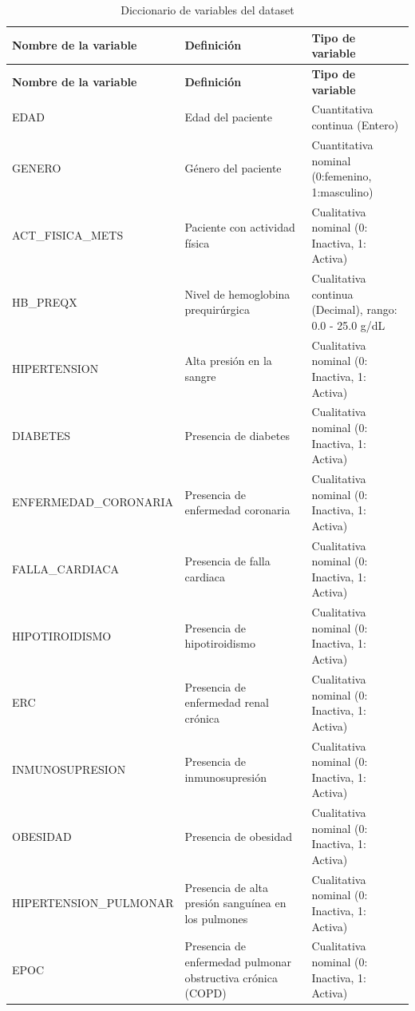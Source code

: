 \begin{center}
\scriptsize 
\renewcommand{\arraystretch}{1.4} 
\begin{xltabular}{\textwidth}{|>{\raggedright\arraybackslash}p{5cm}|>{\raggedright\arraybackslash}X|>{\raggedright\arraybackslash}p{4cm}|}
\caption{Diccionario de variables del dataset} \label{tab:diccionario} \\
\hline
\textbf{Nombre de la variable} & \textbf{Definición} & \textbf{Tipo de variable} \\ \hline
\endfirsthead
\hline
\textbf{Nombre de la variable} & \textbf{Definición} & \textbf{Tipo de variable} \\ \hline
\endhead
\hline
\endfoot
\hline
\endlastfoot
EDAD & Edad del paciente & Cuantitativa continua (Entero) \\ \hline
GENERO & Género del paciente & Cuantitativa nominal (0:femenino, 1:masculino) \\ \hline
ACT\_FISICA\_METS & Paciente con actividad física & Cualitativa nominal (0: Inactiva, 1: Activa) \\ \hline
HB\_PREQX & Nivel de hemoglobina prequirúrgica & Cualitativa continua (Decimal), rango: 0.0 - 25.0 g/dL \\ \hline
HIPERTENSION & Alta presión en la sangre & Cualitativa nominal (0: Inactiva, 1: Activa) \\ \hline
DIABETES & Presencia de diabetes & Cualitativa nominal (0: Inactiva, 1: Activa) \\ \hline
ENFERMEDAD\_CORONARIA & Presencia de enfermedad coronaria & Cualitativa nominal (0: Inactiva, 1: Activa) \\ \hline
FALLA\_CARDIACA & Presencia de falla cardiaca & Cualitativa nominal (0: Inactiva, 1: Activa) \\ \hline
HIPOTIROIDISMO & Presencia de hipotiroidismo & Cualitativa nominal (0: Inactiva, 1: Activa) \\ \hline
ERC & Presencia de enfermedad renal crónica & Cualitativa nominal (0: Inactiva, 1: Activa) \\ \hline
INMUNOSUPRESION & Presencia de inmunosupresión & Cualitativa nominal (0: Inactiva, 1: Activa) \\ \hline
OBESIDAD & Presencia de obesidad & Cualitativa nominal (0: Inactiva, 1: Activa) \\ \hline
HIPERTENSION\_PULMONAR & Presencia de alta presión sanguínea en los pulmones & Cualitativa nominal (0: Inactiva, 1: Activa) \\ \hline
EPOC & Presencia de enfermedad pulmonar obstructiva crónica (COPD) & Cualitativa nominal (0: Inactiva, 1: Activa) \\ \hline

\end{xltabular}
\end{center}
